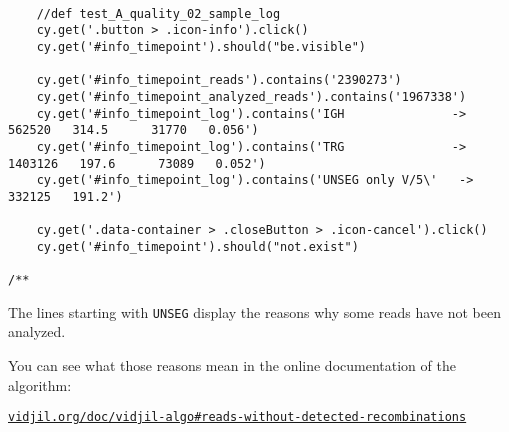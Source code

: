 \begin{verbatim}

    //def test_A_quality_02_sample_log
    cy.get('.button > .icon-info').click()
    cy.get('#info_timepoint').should("be.visible")

    cy.get('#info_timepoint_reads').contains('2390273')
    cy.get('#info_timepoint_analyzed_reads').contains('1967338')
    cy.get('#info_timepoint_log').contains('IGH               ->   562520   314.5      31770   0.056')
    cy.get('#info_timepoint_log').contains('TRG               ->  1403126   197.6      73089   0.052')
    cy.get('#info_timepoint_log').contains('UNSEG only V/5\'   ->   332125   191.2')

    cy.get('.data-container > .closeButton > .icon-cancel').click()
    cy.get('#info_timepoint').should("not.exist")

/**

\end{verbatim}

The lines starting with \texttt{UNSEG} display the reasons why some reads have
not been analyzed.

You can see what those reasons mean in the online documentation of the
algorithm:

 \centerline{\tt\href{http://www.vidjil.org/doc/vidjil-algo/\#reads-without-detected-recombinations}{vidjil.org/doc/vidjil-algo\#reads-without-detected-recombinations}}



